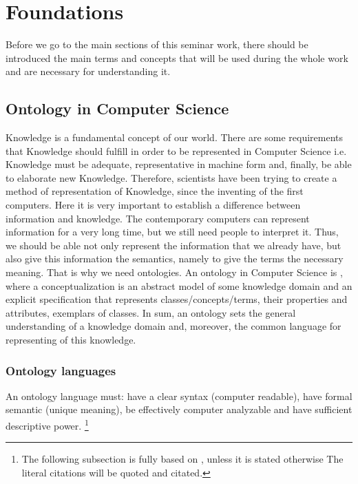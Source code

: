 \section{Foundations}
Before we go to the main sections of this seminar work, there should be introduced the main terms and concepts that will be used during the whole work and are necessary for understanding it.

	\subsection{Ontology in Computer Science}
	Knowledge is a fundamental concept of our world. There are some requirements that Knowledge should fulfill in order to be represented in Computer Science i.e. Knowledge must be adequate, representative in machine form and, finally, be able to elaborate new Knowledge. Therefore, scientists have been trying to create a method of representation of Knowledge, since the inventing of the first computers. Here it is very important to establish a difference between information and knowledge. The contemporary computers can represent information for a very long time, but we still need people to interpret it. Thus, we should be able not only represent the information that we already have, but also give this information the semantics, namely to give the terms the necessary meaning. That is why we need ontologies. An ontology in Computer Science is \frqq\cite{Gru93}, where a conceptualization is an abstract model of some knowledge domain and an explicit specification that  represents classes/concepts/terms, their properties and attributes, exemplars of classes. In sum, an ontology sets the general understanding of a knowledge domain and, moreover, the common language for representing of this knowledge.     
		\subsubsection{Ontology languages}
		An ontology language must: have a clear syntax (computer readable), have formal semantic (unique meaning), be effectively computer analyzable and have sufficient descriptive power. \footnote{The following subsection is fully based on \cite{Kon10}, unless it is stated otherwise  The literal citations will be quoted and citated.}
		
